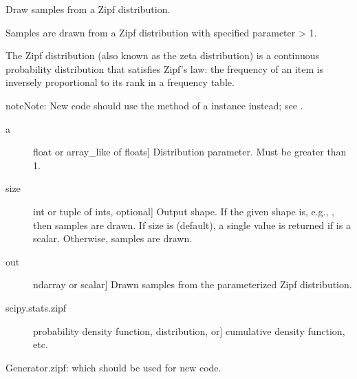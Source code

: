 \documentclass[letterpaper,10pt,english]{sphinxmanual}
\begin{document}
\begin{fulllineitems}
\label{\detokenize{infrapy.utils:infrapy.utils.ref2sac.zipf}}
Draw samples from a Zipf distribution.

Samples are drawn from a Zipf distribution with specified parameter
 \textgreater{} 1.

The Zipf distribution (also known as the zeta distribution) is a
continuous probability distribution that satisfies Zipf’s law: the
frequency of an item is inversely proportional to its rank in a
frequency table.

\begin{sphinxadmonition}{note}{Note:}
New code should use the  method of a 
instance instead; see .
\end{sphinxadmonition}
\begin{description}
\item[{a}] \leavevmode{[}float or array\_like of floats{]}
Distribution parameter. Must be greater than 1.

\item[{size}] \leavevmode{[}int or tuple of ints, optional{]}
Output shape.  If the given shape is, e.g., , then
 samples are drawn.  If size is  (default),
a single value is returned if  is a scalar. Otherwise,
 samples are drawn.

\end{description}
\begin{description}
\item[{out}] \leavevmode{[}ndarray or scalar{]}
Drawn samples from the parameterized Zipf distribution.

\end{description}
\begin{description}
\item[{scipy.stats.zipf}] \leavevmode{[}probability density function, distribution, or{]}
cumulative density function, etc.

\end{description}

Generator.zipf: which should be used for new code.


\end{fulllineitems}
\end{document}
